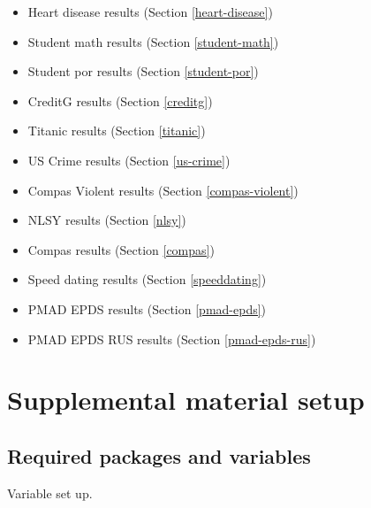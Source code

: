 \documentclass[
]{book}
\providecommand{\tightlist}{%
  \setlength{\itemsep}{0pt}\setlength{\parskip}{0pt}}
\begin{document}
\begin{itemize}
\tightlist
\item
  Heart disease results (Section \ref{heart-disease})
\item
  Student math results (Section \ref{student-math})
\item
  Student por results (Section \ref{student-por})
\item
  CreditG results (Section \ref{creditg})
\item
  Titanic results (Section \ref{titanic})
\item
  US Crime results (Section \ref{us-crime})
\item
  Compas Violent results (Section \ref{compas-violent})
\item
  NLSY results (Section \ref{nlsy})
\item
  Compas results (Section \ref{compas})
\item
  Speed dating results (Section \ref{speeddating})
\item
  PMAD EPDS results (Section \ref{pmad-epds})
\item
  PMAD EPDS RUS results (Section \ref{pmad-epds-rus})
\end{itemize}

\hypertarget{supplemental-material-setup}{%
\section{Supplemental material setup}\label{supplemental-material-setup}}

\hypertarget{required-packages-and-variables}{%
\subsection{Required packages and variables}\label{required-packages-and-variables}}

Variable set up.
\end{document}

